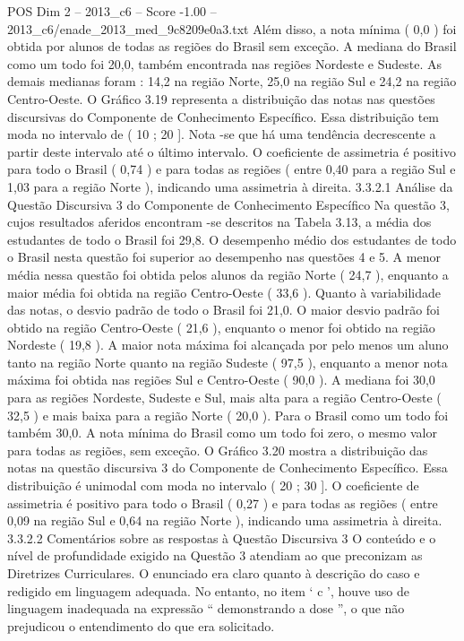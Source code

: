\begin{textsample}{POS Dim 2 – 2013\_c6 – Score -1.00 – 2013\_c6/enade\_2013\_med\_9c8209e0a3.txt}
Além disso, a nota mínima ( 0,0 ) foi obtida por alunos de todas as regiões do Brasil sem exceção.
A mediana do Brasil como um todo foi 20,0, também encontrada nas regiões Nordeste e Sudeste.
As demais medianas foram : 14,2 na região Norte, 25,0 na região Sul e 24,2 na região Centro-Oeste.
O Gráfico 3.19 representa a distribuição das notas nas questões discursivas do Componente de Conhecimento Específico.
Essa distribuição tem moda no intervalo de ( 10 ; 20 ].
Nota -se que há uma tendência decrescente a partir deste intervalo até o último intervalo.
O coeficiente de assimetria é positivo para todo o Brasil ( 0,74 ) e para todas as regiões ( entre 0,40 para a região Sul e 1,03 para a região Norte ), indicando uma assimetria à direita. 3.3.2.1 Análise da Questão Discursiva 3 do Componente de Conhecimento Específico Na questão 3, cujos resultados aferidos encontram -se descritos na Tabela 3.13, a média dos estudantes de todo o Brasil foi 29,8.
O desempenho médio dos estudantes de todo o Brasil nesta questão foi superior ao desempenho nas questões 4 e 5.
A menor média nessa questão foi obtida pelos alunos da região Norte ( 24,7 ), enquanto a maior média foi obtida na região Centro-Oeste ( 33,6 ).
Quanto à variabilidade das notas, o desvio padrão de todo o Brasil foi 21,0.
O maior desvio padrão foi obtido na região Centro-Oeste ( 21,6 ), enquanto o menor foi obtido na região Nordeste ( 19,8 ).
A maior nota máxima foi alcançada por pelo menos um aluno tanto na região Norte quanto na região Sudeste ( 97,5 ), enquanto a menor nota máxima foi obtida nas regiões Sul e Centro-Oeste ( 90,0 ).
A mediana foi 30,0 para as regiões Nordeste, Sudeste e Sul, mais alta para a região Centro-Oeste ( 32,5 ) e mais baixa para a região Norte ( 20,0 ).
Para o Brasil como um todo foi também 30,0.
A nota mínima do Brasil como um todo foi zero, o mesmo valor para todas as regiões, sem exceção.
O Gráfico 3.20 mostra a distribuição das notas na questão discursiva 3 do Componente de Conhecimento Específico.
Essa distribuição é unimodal com moda no intervalo ( 20 ; 30 ].
O coeficiente de assimetria é positivo para todo o Brasil ( 0,27 ) e para todas as regiões ( entre 0,09 na região Sul e 0,64 na região Norte ), indicando uma assimetria à direita. 3.3.2.2 Comentários sobre as respostas à Questão Discursiva 3 O conteúdo e o nível de profundidade exigido na Questão 3 atendiam ao que preconizam as Diretrizes Curriculares.
O enunciado era claro quanto à descrição do caso e redigido em linguagem adequada.
No entanto, no item ‘ c ’, houve uso de linguagem inadequada na expressão “ demonstrando a dose ”, o que não prejudicou o entendimento do que era solicitado.

\end{textsample}
